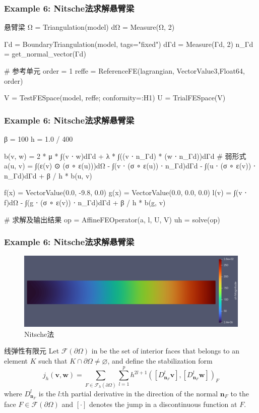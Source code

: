 \documentclass[lang=en,aspectratio=43,theme=default,logo=on]{simplebeamer}
\begin{document}
\begin{frame}[fragile]
    \frametitle{Example 6: Nitsche法求解悬臂梁}
\begin{codex}{1}{悬臂梁}
Ω = Triangulation(model)
dΩ = Measure(Ω, 2)

Γd = BoundaryTriangulation(model, tags="fixed")
dΓd = Measure(Γd, 2)
n_Γd = get_normal_vector(Γd)

# 参考单元
order = 1
reffe = ReferenceFE(lagrangian, VectorValue{3,Float64}, order)

V = TestFESpace(model, reffe; conformity=:H1)
U = TrialFESpace(V)
\end{codex}
\end{frame}

\begin{frame}[fragile]
    \frametitle{Example 6: Nitsche法求解悬臂梁}
\begin{code}
β = 100
h = 1.0 / 400

b(v, w) = 2 * μ * ∫(v ⋅ w)dΓd + λ * ∫((v ⋅ n_Γd) * (w ⋅ n_Γd))dΓd
# 弱形式
a(u, v) = ∫(ε(v) ⊙ (σ ∘ ε(u)))dΩ - ∫(v ⋅ (σ ∘ ε(u)) ⋅ n_Γd)dΓd - ∫(u ⋅ (σ ∘ ε(v)) ⋅ n_Γd)dΓd + β / h * b(u, v)

f(x) = VectorValue(0.0, -9.8, 0.0)
g(x) = VectorValue(0.0, 0.0, 0.0)
l(v) = ∫(v ⋅ f)dΩ - ∫(g ⋅ (σ ∘ ε(v)) ⋅ n_Γd)dΓd + β / h * b(g, v)

# 求解及输出结果
op = AffineFEOperator(a, l, U, V)
uh = solve(op)
\end{code}
\end{frame}

\begin{frame}[fragile]
    \frametitle{Example 6: Nitsche法求解悬臂梁}
    \begin{figure}
        \centering %
        \includegraphics[width=1\textwidth]{./img/017.png}
        \caption{Nitsche法}
    \end{figure}
\end{frame}

\begin{frame}{线弹性有限元}
Let $\mathcal{F}(\partial \Omega)$ in be the set of interior faces that belongs to an element $K$ such
that $K\cap \partial \Omega \neq \varnothing $, and define the stabilization form
\begin{equation*}
    j_{h}(\boldsymbol{v}, \boldsymbol{w})=\sum_{F \in \mathcal{F}_{h}(\partial \Omega)} \sum_{l=1}^{p} h^{2 l+1}\left(\left[D_{\boldsymbol{n}_{F}}^{l} \boldsymbol{v}\right],\left[D_{\boldsymbol{n}_{F}}^{l} \boldsymbol{w}\right]\right)_{F}
\end{equation*}
where $D_{\mathbf{n}_F}^l$ is the $l$:th partial derivative in the direction of the normal $\mathbf{n}_F$ to the face $F \in \mathcal{F}(\partial \Omega)$ and $[·]$ denotes the jump in a discontinuous function at $F$.
\end{frame}
\end{document}
